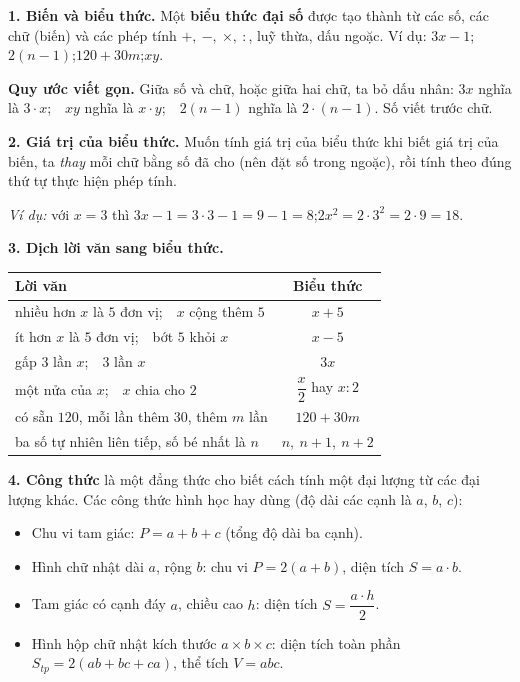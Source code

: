 \begin{knowbox}
\textbf{1. Biến và biểu thức.} Một \textbf{biểu thức đại số} được tạo thành từ các số, các chữ
(biến) và các phép tính $+,\ -,\ \times,\ :$, luỹ thừa, dấu ngoặc. Ví dụ: $3x-1$;\quad $2(n-1)$;\quad $120+30m$;\quad $xy$.

\textbf{Quy ước viết gọn.} Giữa số và chữ, hoặc giữa hai chữ, ta bỏ dấu nhân:
$3x$ nghĩa là $3\cdot x$;\ \ $xy$ nghĩa là $x\cdot y$;\ \ $2(n-1)$ nghĩa là $2\cdot(n-1)$. Số viết trước chữ.

\textbf{2. Giá trị của biểu thức.} Muốn tính giá trị của biểu thức khi biết giá trị của biến, ta
\emph{thay} mỗi chữ bằng số đã cho (nên đặt số trong ngoặc), rồi tính theo đúng thứ tự thực hiện phép tính.

\emph{Ví dụ:} với $x=3$ thì $3x-1=3\cdot 3-1=9-1=8$;\quad $2x^2=2\cdot 3^2=2\cdot 9=18$.

\textbf{3. Dịch lời văn sang biểu thức.}

\begin{center}
\begin{tabular}{|l|c|}
\hline
\rowcolor{tmBlue!10}\textbf{Lời văn} & \textbf{Biểu thức}\\ \hline
nhiều hơn $x$ là $5$ đơn vị;\ \ $x$ cộng thêm $5$ & $x+5$\\ \hline
ít hơn $x$ là $5$ đơn vị;\ \ bớt $5$ khỏi $x$ & $x-5$\\ \hline
gấp $3$ lần $x$;\ \ $3$ lần $x$ & $3x$\\ \hline
một nửa của $x$;\ \ $x$ chia cho $2$ & $\dfrac{x}{2}$ hay $x:2$\\ \hline
có sẵn $120$, mỗi lần thêm $30$, thêm $m$ lần & $120+30m$\\ \hline
ba số tự nhiên liên tiếp, số bé nhất là $n$ & $n,\ n+1,\ n+2$\\ \hline
\end{tabular}
\end{center}

\textbf{4. Công thức} là một đẳng thức cho biết cách tính một đại lượng từ các đại lượng khác.
Các công thức hình học hay dùng (độ dài các cạnh là $a$, $b$, $c$):
\begin{itemize}[leftmargin=1.4em,itemsep=1pt,topsep=2pt]
\item Chu vi tam giác: $P=a+b+c$ (tổng độ dài ba cạnh).
\item Hình chữ nhật dài $a$, rộng $b$: chu vi $P=2(a+b)$, diện tích $S=a\cdot b$.
\item Tam giác có cạnh đáy $a$, chiều cao $h$: diện tích $S=\dfrac{a\cdot h}{2}$.
\item Hình hộp chữ nhật kích thước $a\times b\times c$: diện tích toàn phần $S_{tp}=2(ab+bc+ca)$, thể tích $V=abc$.
\end{itemize}
\end{knowbox}

